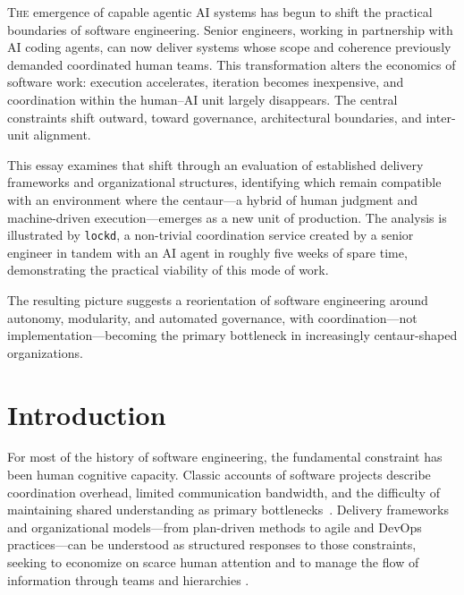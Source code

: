 \documentclass[11pt, a4paper, twocolumn]{article} %
\begin{document}
\color{white}


\vspace*{\fill}

\noindent
\makeatletter
\@date\par
\makeatother

\vspace*{0.2cm}

\lettrine[lines=3,lhang=0.1,findent=1pt]{T}{he} emergence of capable agentic AI
systems has begun to shift the practical boundaries of software
engineering. Senior engineers, working in partnership with AI coding agents, can
now deliver systems whose scope and coherence previously demanded coordinated
human teams. This transformation alters the economics of software work:
execution accelerates, iteration becomes inexpensive, and coordination within
the human–AI unit largely disappears. The central constraints shift outward,
toward governance, architectural boundaries, and inter-unit alignment.

\newpage

\vfill
This essay examines that shift through an evaluation of established delivery
frameworks and organizational structures, identifying which remain compatible
with an environment where the centaur---a hybrid of human judgment and
machine-driven execution---emerges as a new unit of production. The analysis is
illustrated by \texttt{lockd}, a non-trivial coordination service created by a
senior engineer in tandem with an AI agent in roughly five weeks of spare time,
demonstrating the practical viability of this mode of work.

The resulting picture suggests a reorientation of software engineering around
autonomy, modularity, and automated governance, with coordination---not
implementation---becoming the primary bottleneck in increasingly centaur-shaped
organizations.

\clearpage

\color{Black}

\section*{Introduction}
\label{sec:introduction}

For most of the history of software engineering, the fundamental constraint has
been human cognitive capacity. Classic accounts of software projects describe
coordination overhead, limited communication bandwidth, and the difficulty of
maintaining shared understanding as primary bottlenecks~\citep{brooks1995mythical,conway1968how}. Delivery frameworks and organizational models---from
plan-driven methods to agile and DevOps practices---can be understood as
structured responses to those constraints, seeking to economize on scarce human
attention and to manage the flow of information through teams and hierarchies
\citep{cockburn2001,highsmith2002agile,humble2015leanenterprise,galbraith1974,
burnsstalker1961}.
\end{document}

